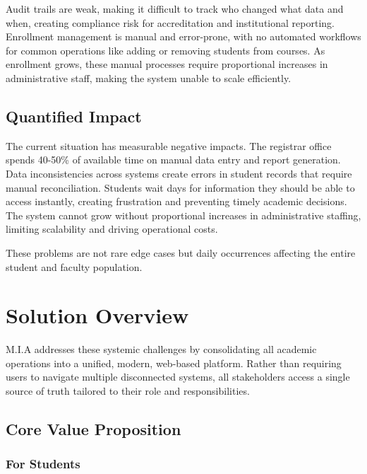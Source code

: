 \documentclass[12pt,a4paper]{report}
\begin{document}
Audit trails are weak, making it difficult to track who changed what data and when, creating compliance risk for accreditation and institutional reporting. Enrollment management is manual and error-prone, with no automated workflows for common operations like adding or removing students from courses. As enrollment grows, these manual processes require proportional increases in administrative staff, making the system unable to scale efficiently.

\section{Quantified Impact}

The current situation has measurable negative impacts. The registrar office spends 40-50\% of available time on manual data entry and report generation. Data inconsistencies across systems create errors in student records that require manual reconciliation. Students wait days for information they should be able to access instantly, creating frustration and preventing timely academic decisions. The system cannot grow without proportional increases in administrative staffing, limiting scalability and driving operational costs.

These problems are not rare edge cases but daily occurrences affecting the entire student and faculty population.

\chapter{Solution Overview}

M.I.A addresses these systemic challenges by consolidating all academic operations into a unified, modern, web-based platform. Rather than requiring users to navigate multiple disconnected systems, all stakeholders access a single source of truth tailored to their role and responsibilities.

\section{Core Value Proposition}

\subsection{For Students}
\end{document}
